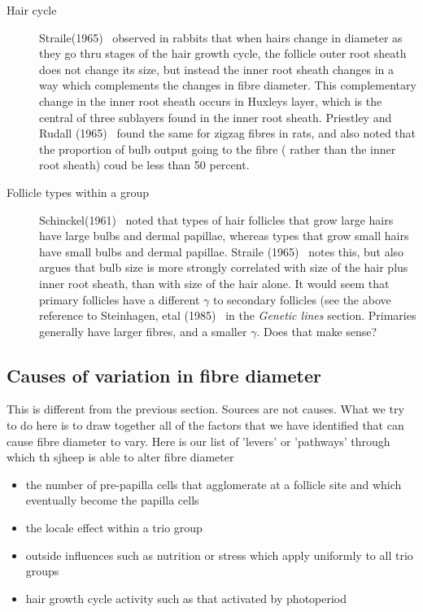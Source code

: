\documentclass[titlepage]{article}  %
\begin{document}
\begin{description}
\item[Hair cycle] Straile(1965)~\cite{stra:65} observed in rabbits that when hairs change in diameter as they go thru stages of the hair growth cycle, the follicle outer root sheath does not change its size, but instead the inner root sheath changes in a way which complements the changes in fibre diameter. This complementary change in the inner root sheath occurs in Huxleys layer, which is the central of three sublayers found in the inner root sheath. 
Priestley and Rudall (1965)~\cite{prie:65} found the same for zigzag fibres in rats, and also noted that the proportion of bulb output going to the fibre ( rather than the inner root sheath) coud be less than 50 percent.
\item[Follicle types within a group] Schinckel(1961)~\cite{schi:61} noted that types of hair follicles that grow large hairs have large bulbs and dermal papillae, whereas types that grow small hairs have small bulbs and dermal papillae. Straile (1965)~\cite{stra:65} notes this, but also argues that bulb size is more strongly correlated with size of the hair plus inner root sheath, than with size of the hair alone.
It would seem that primary follicles have a different $\gamma$ to secondary follicles (see the above reference to Steinhagen, etal (1985)~\cite{stei:85} in the {\em Genetic lines} section. Primaries generally have larger fibres, and a smaller $\gamma$. Does that make sense?
\end{description}

\subsection{Causes of variation in fibre diameter}
This is different from the previous section. Sources are not causes. What we try to do here is to draw together all of the factors that we have identified that can cause fibre diameter to vary. Here is our list of 'levers' or 'pathways' through which th sjheep is able to alter fibre diameter
\begin{itemize}
\item the number of pre-papilla cells that agglomerate at a follicle site and which eventually become the papilla cells 
\item the {\em} locale effect within a trio group
\item outside influences such as nutrition or stress  which apply uniformly to all trio groups 
\item hair growth cycle activity such as that activated by photoperiod
\end{itemize}
\end{document}
